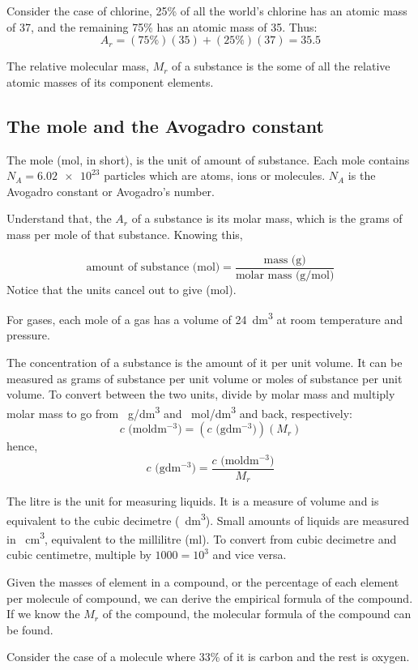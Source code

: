 Consider the case of chlorine, 25\% of all the world's chlorine has an atomic mass of 37, and the
remaining 75\% has an atomic mass of 35. Thus:
$$ A_r = (75\%)(35) + (25\%)(37) = 35.5$$

The relative molecular mass, $M_r$ of a substance is the some of all the relative atomic masses of its
component elements.

\subsection{The mole and the Avogadro constant}
The mole (mol, in short), is the unit of amount of substance. Each mole contains $N_A = \num{6.02e23}$
particles which are atoms, ions or molecules. $N_A$ is the Avogadro constant or Avogadro's number.

Understand that, the $A_r$ of a substance is its molar mass, which is the grams of mass per mole
of that substance. Knowing this,

$$ \textrm{amount of substance (mol)} = \frac{\textrm{mass (g)}}{\textrm{molar mass (g/mol)}} $$
Notice that the units cancel out to give (mol).

For gases, each mole of a gas has a volume of \SI{24}{dm^3} at room temperature and pressure.

The concentration of a substance is the amount of it per unit volume. It can be measured as grams
of substance per unit volume or moles of substance per unit volume. To convert between the two
units, divide by molar mass and multiply molar mass to go from \SI{}{g/dm^3} and \SI{}{mol/dm^3}
and back, respectively:
$$ c \textrm{ (moldm$^{-3}$)} = (c \textrm{ (gdm$^{-3}$)})(M_r)$$
hence,
$$c \textrm{ (gdm$^{-3}$)}  =  \frac{c \textrm{ (moldm$^{-3}$)}}{M_r}$$

The litre is the unit for measuring liquids. It is a measure of volume and is equivalent to the
cubic decimetre (\SI{}{dm^3}). Small amounts of liquids are measured in \SI{}{cm^3}, equivalent to
the millilitre (ml). To convert from cubic decimetre and cubic centimetre, multiple by $1000 = 10^3$
and vice versa.

Given the masses of element in a compound, or the percentage of each element per molecule of 
compound, we can derive the empirical formula of the compound. If we know the $M_r$ of the compound,
the molecular formula of the compound can be found.

Consider the case of a molecule where 33\% of it is carbon and the rest is oxygen.
